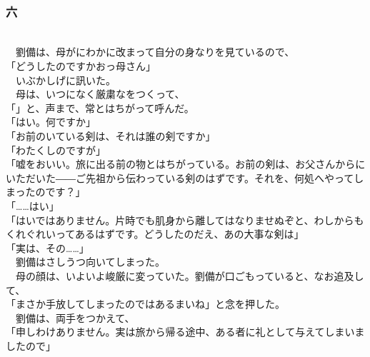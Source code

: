 \documentclass[
  paper=a5,
  fontsize=10pt,
  jafontsize=9.5pt,
  tate,                  %
  open_bracket_pos=nibu, %
]{jlreq}
\begin{document}
\\

\subsubsection{六}

\\


　劉備は、母がにわかに改まって自分の身なりを見ているので、\\


「どうしたのですかおっ母さん」\\


　いぶかしげに訊いた。\\


　母は、いつになく厳粛なをつくって、\\


「」と、声まで、常とはちがって呼んだ。\\


「はい。何ですか」\\


「お前のいている剣は、それは誰の剣ですか」\\


「わたくしのですが」\\


「嘘をおいい。旅に出る前の物とはちがっている。お前の剣は、お父さんからにいただいた――ご先祖から伝わっている剣のはずです。それを、何処へやってしまったのです？」\\


「……はい」\\


「はいではありません。片時でも肌身から離してはなりませぬぞと、わしからもくれぐれいってあるはずです。どうしたのだえ、あの大事な剣は」\\


「実は、その……」\\


　劉備はさしうつ向いてしまった。\\


　母の顔は、いよいよ峻厳に変っていた。劉備が口ごもっていると、なお追及して、\\


「まさか手放してしまったのではあるまいね」と念を押した。\\


　劉備は、両手をつかえて、\\


「申しわけありません。実は旅から帰る途中、ある者に礼として与えてしまいましたので」\\
\end{document}
